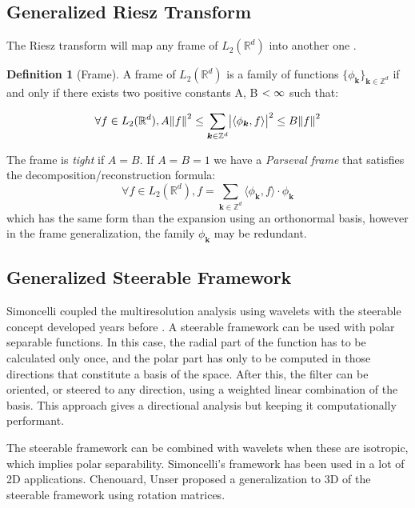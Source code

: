 \documentclass{InsightArticle}
\theoremstyle{definition}
\newtheorem{definition}{Definition}[section]
\begin{document}
\subsection{Generalized Riesz Transform}
The Riesz transform will map any frame of $L_2(\mathbb{R}^d)$ into another one \cite{held_steerable_2010, unser_wavelet_2010}.\\
\begin{definition}[Frame]
  A frame of $L_2(\mathbb{R}^d)$ is a family of functions $\{\phi_{\bm{k}}\}_{ \bm{k}\in\mathbb{Z}^d}$ if and only if there exists two positive constants A, B $< \infty$ such that:

\begin{equation}
  \forall f \in L_2(\mathbb{R}^d), A\norm{f}^2 \le \sum_{\bm{k}\in\mathbb{Z}^d}\abs{\langle\phi_{\bm{k}},f\rangle}^2 \le B\norm{f}^2
\end{equation}

The frame is \textit{tight} if $A=B$. If $A=B=1$ we have a \textit{Parseval frame} that satisfies the decomposition/reconstruction formula:
\begin{equation}
  \forall f \in L_2(\mathbb{R}^d), f = \sum_{\bm{k}\in\mathbb{Z}^d}\langle\phi_{\bm{k}},f\rangle \cdot \phi_{\bm{k}}
\end{equation}
which has the same form than the expansion using an orthonormal basis, however in the frame generalization, the family $\phi_{\bm{k}}$ may be redundant.
\end{definition}

\subsection{Generalized Steerable Framework}
Simoncelli \cite{simoncelli_steerable_1995} coupled the multiresolution analysis using wavelets with the steerable concept developed years before \cite{freeman_design_1991}. A steerable framework can be used with polar separable functions. In this case, the radial part of the function has to be calculated only once, and the polar part has only to be computed in those directions that constitute a basis of the space. After this, the filter can be oriented, or steered to any direction, using a weighted linear combination of the basis. This approach gives a directional analysis but keeping it computationally performant.

The steerable framework can be combined with wavelets when these are isotropic, which implies polar separability.
Simoncelli's framework has been used in a lot of 2D applications. Chenouard, Unser \cite{held_steerable_2010,unser_steerable_2011,chenouard_3d_2012} proposed a generalization to 3D of the steerable framework using rotation matrices.
\end{document}
